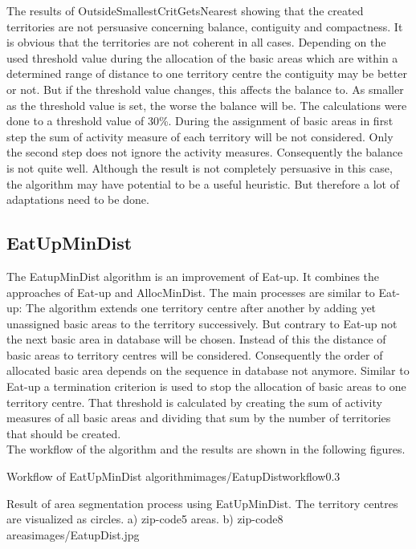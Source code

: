 The results of OutsideSmallestCritGetsNearest showing that the created territories are not persuasive concerning balance, contiguity and compactness. It is obvious that the territories are not coherent in all cases. Depending on the used threshold value during the allocation of the basic areas which are within a determined range of distance to one territory centre the contiguity may be better or not. But if the threshold value changes, this affects the balance to. As smaller as the threshold value is set, the worse the balance will be. The calculations were done to a threshold value of 30\%. During the assignment of basic areas in first step the sum of activity measure of each territory will be not considered. Only the second step does not ignore the activity measures. Consequently the balance is not quite well. Although the result is not completely persuasive in this case, the algorithm may have potential to be a useful heuristic. But therefore a lot of adaptations need to be done.

\subsection{EatUpMinDist}
The EatupMinDist algorithm is an improvement of Eat-up. It combines the approaches of Eat-up and AllocMinDist. The main processes are similar to Eat-up: The algorithm extends one territory centre after another by adding yet unassigned basic areas to the territory successively. But contrary to Eat-up not the next basic area in database will be chosen. Instead of this the distance of basic areas to territory centres will be considered. Consequently the order of allocated basic area depends on the sequence in database not anymore. Similar to Eat-up a termination criterion is used to stop the allocation of basic areas to one territory centre. That threshold is calculated by creating the sum of activity measures of all basic areas and dividing that sum by the number of territories that should be created.\\
The workflow of the algorithm and the results are shown in the following figures.


\begin{figurevarSize}{Workflow of EatUpMinDist algorithm}{images/EatupDistworkflow}{0.3}\end{figurevarSize}


\begin{figureOwn}{Result of area segmentation process using EatUpMinDist. The territory centres are visualized as circles. a) zip-code5 areas. b) zip-code8 areas}{images/EatupDist.jpg}\end{figureOwn}

